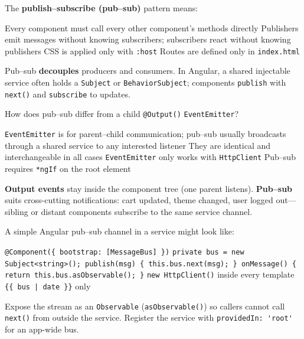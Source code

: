 \question[4]
The \textbf{publish--subscribe (pub--sub)} pattern means:
\begin{choices}
  \choice Every component must call every other component's methods directly
  \CorrectChoice Publishers emit messages without knowing subscribers; subscribers react without knowing publishers
  \choice CSS is applied only with \lstinline[style=htmlinline]|:host|
  \choice Routes are defined only in \texttt{index.html}
\end{choices}
\begin{solution}
  Pub--sub \textbf{decouples} producers and consumers. In Angular, a shared injectable service often holds a \lstinline[style=tsinline]|Subject| or \lstinline[style=tsinline]|BehaviorSubject|; components \texttt{publish} with \lstinline[style=tsinline]|next()| and \texttt{subscribe} to updates.
\end{solution}

\question[4]
How does pub--sub differ from a child \lstinline[style=tsinline]|@Output()| \lstinline[style=tsinline]|EventEmitter|?
\begin{choices}
  \CorrectChoice \lstinline[style=tsinline]|EventEmitter| is for parent--child communication; pub--sub usually broadcasts through a shared service to any interested listener
  \choice They are identical and interchangeable in all cases
  \choice \lstinline[style=tsinline]|EventEmitter| only works with \texttt{HttpClient}
  \choice Pub--sub requires \lstinline[style=htmlinline]|*ngIf| on the root element
\end{choices}
\begin{solution}
  \textbf{Output events} stay inside the component tree (one parent listens). \textbf{Pub--sub} suits cross-cutting notifications: cart updated, theme changed, user logged out---sibling or distant components subscribe to the same service channel.
\end{solution}

\question[4]
A simple Angular pub--sub channel in a service might look like:
\begin{choices}
  \choice \lstinline[style=tsinline]|@Component({ bootstrap: [MessageBus] })|
  \CorrectChoice \lstinline[style=tsinline]|private bus = new Subject<string>(); publish(msg) { this.bus.next(msg); } onMessage() { return this.bus.asObservable(); }|
  \choice \lstinline[style=tsinline]|new HttpClient()| inside every template
  \choice \lstinline[style=htmlinline]!{{ bus | date }}! only
\end{choices}
\begin{solution}
  Expose the stream as an \lstinline[style=tsinline]|Observable| (\lstinline[style=tsinline]|asObservable()|) so callers cannot call \lstinline[style=tsinline]|next()| from outside the service. Register the service with \lstinline[style=tsinline]|providedIn: 'root'| for an app-wide bus.
\end{solution}

